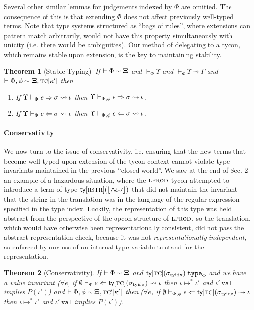 \documentclass[9pt,preprint]{sigplanconf}
\newtheorem{theorem}{Theorem}
\begin{document}
Several other similar lemmas for judgements indexed by $\Phi$ are omitted. The consequence of this is that extending $\Phi$ does not affect previously well-typed terms. Note that type systems structured as ``bags of rules'', where extensions can pattern match arbitrarily, would not have this property simultaneously with unicity (i.e. there would be ambiguities). Our method of delegating to a tycon, which remains stable upon extension, is the key to maintaining stability.
\begin{theorem}[Stable Typing]
If $\vdash \Phi \sim \boldsymbol\Xi$ and $\vdash_\Phi \Upsilon$ and $\vdash_\Phi \Upsilon \leadsto \Gamma$  and $\vdash \Phi, \phi \sim \boldsymbol\Xi, \textsc{tc}[\kappa']$ then
\begin{enumerate}
\item If $\Upsilon \vdash_{\Phi} e \Rightarrow \sigma \leadsto \iota$ then $\Upsilon \vdash_{\Phi, \phi} e \Rightarrow \sigma \leadsto \iota$.
\item If $\Upsilon \vdash_{\Phi} e \Leftarrow \sigma \leadsto \iota$ then $\Upsilon \vdash_{\Phi, \phi} e \Leftarrow \sigma \leadsto \iota$.
\end{enumerate}
\end{theorem}

\paragraph{Conservativity}
We now turn to the issue of conservativity, i.e. ensuring that the new terms that become well-typed upon extension of the tycon context cannot violate type invariants maintained in the previous ``closed world''. We saw at the end of Sec. 2 an example of a hazardous situation, where the $\textsc{lprod}$ tycon attempted to introduce a term of type $\sty{\tcvar{rstr}}{\desugar{\concrx{\digit+}}}$ that did not maintain the invariant that the string in the translation was in the language of the regular expression specified in the type index. Luckily, the representation of this type was held abstract from the perspective of the opcon structure of $\textsc{lprod}$, so the translation, which would have otherwise been representationally consistent, did not pass the abstract representation check, because it was not \emph{representationally independent}, as enforced by our use of an internal type variable to stand for the representation.

\begin{theorem}[Conservativity]If $\vdash \Phi \sim \boldsymbol\Xi$ and ${\sf ty}[\textsc{tc}](\sigma_\text{tyidx})~\mathtt{type}_{\Phi}$ and we have a value invariant ($\forall e$, if $\emptyset \vdash_{\Phi} e \Leftarrow {\sf ty}[\textsc{tc}](\sigma_\text{tyidx}) \leadsto \iota$ then $\iota \mapsto^{*} \iota'$ and $\iota'~\mathtt{val}$ implies $P(\iota')$) and $\vdash \Phi, \phi \sim \boldsymbol\Xi, \textsc{tc}'[\kappa']$ then ($\forall e$, if $\emptyset \vdash_{\Phi, \phi} e \Leftarrow {\sf ty}[\textsc{tc}](\sigma_\text{tyidx}) \leadsto \iota$ then $\iota \mapsto^{*} \iota'$ and $\iota'~\mathtt{val}$ implies $P(\iota')$).\end{theorem}
\end{document}
